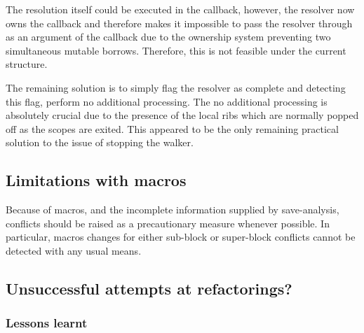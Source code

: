 The resolution itself could be executed in the callback, however, the resolver now owns the callback and therefore makes it impossible to pass the resolver through as an argument of the callback due to the ownership system preventing two simultaneous mutable borrows. Therefore, this is not feasible under the current structure.

The remaining solution is to simply flag the resolver as complete and detecting this flag, perform no additional processing. The no additional processing is absolutely crucial due to the presence of the local ribs which are normally popped off as the scopes are exited. This appeared to be the only remaining practical solution to the issue of stopping the walker.

\subsection{Limitations with macros}
Because of macros, and the incomplete information supplied by save-analysis, conflicts should be raised as a precautionary measure whenever possible. In particular, macros changes for either sub-block or super-block conflicts cannot be detected with any usual means.

\subsection{Unsuccessful attempts at refactorings?}
\subsubsection{Lessons learnt}